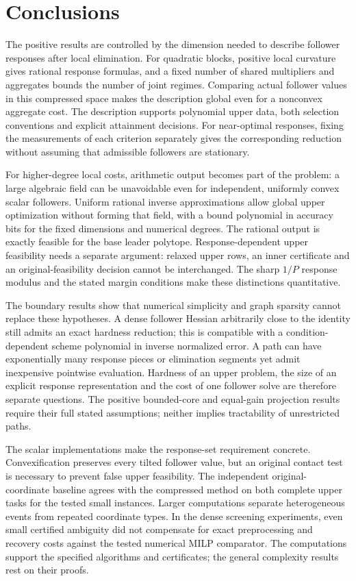 \section{Conclusions}\label{sec:conclusions}

The positive results are controlled by the dimension needed to describe
follower responses after local elimination. For quadratic blocks, positive
local curvature gives rational response formulas, and a fixed number of
shared multipliers and aggregates bounds the number of joint regimes.
Comparing actual follower values in this compressed space makes the
description global even for a nonconvex aggregate cost. The description
supports polynomial upper data, both selection conventions and explicit
attainment decisions. For near-optimal responses, fixing the measurements
of each criterion separately gives the corresponding reduction without
assuming that admissible followers are stationary.

For higher-degree local costs, arithmetic output becomes part of the
problem: a large algebraic field can be unavoidable even for independent,
uniformly convex scalar followers. Uniform rational inverse approximations
allow global upper optimization without forming that field, with a bound
polynomial in accuracy bits for the fixed dimensions and numerical degrees.
The rational output is exactly feasible for the base leader polytope.
Response-dependent upper feasibility needs a separate argument: relaxed
upper rows, an inner certificate and an original-feasibility decision
cannot be interchanged. The sharp $1/P$ response modulus and the stated
margin conditions make these distinctions quantitative.

The boundary results show that numerical simplicity and graph sparsity
cannot replace these hypotheses. A dense follower Hessian arbitrarily close
to the identity still admits an exact hardness reduction; this is
compatible with a condition-dependent scheme polynomial in inverse
normalized error. A path can have exponentially many response pieces or
elimination segments yet admit inexpensive pointwise evaluation. Hardness
of an upper problem, the size of an explicit response representation and
the cost of one follower solve are therefore separate questions. The
positive bounded-core and equal-gain projection results require their full
stated assumptions; neither implies tractability of unrestricted paths.

The scalar implementations make the response-set requirement concrete.
Convexification preserves every tilted follower value, but an original
contact test is necessary to prevent false upper feasibility. The
independent original-coordinate baseline agrees with the compressed method on
both complete upper tasks for the tested small instances. Larger
computations separate heterogeneous events from repeated coordinate types.
In the dense screening experiments, even small certified ambiguity did not
compensate for exact preprocessing and recovery costs against the tested
numerical MILP comparator. The computations support the specified
algorithms and certificates; the general complexity results rest on their
proofs.

